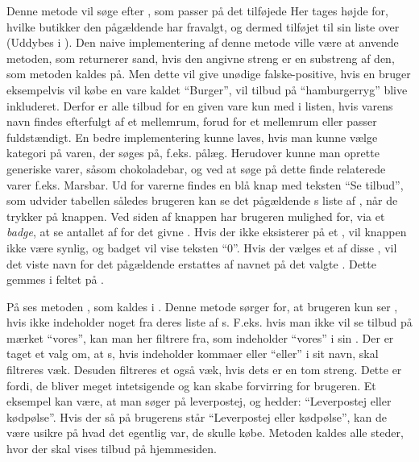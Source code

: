 Denne metode vil søge efter , som passer på det tilføjede 
Her tages højde for, hvilke butikker den pågældende  har fravalgt, og dermed tilføjet til sin liste over  (Uddybes i ).
Den naive implementering af denne metode ville være at anvende  metoden, som returnerer sand, hvis den angivne streng er en substreng af den, som metoden kaldes på. 
Men dette vil give unødige falske-positive, hvis en bruger eksempelvis vil købe en vare kaldet ``Burger'', vil tilbud på ``hamburgerryg'' blive inkluderet.
Derfor er alle tilbud for en given vare kun med i listen, hvis varens navn findes efterfulgt af et mellemrum, forud for et mellemrum eller passer fuldstændigt.
En bedre implementering kunne laves, hvis man kunne vælge kategori på varen, der søges på, f.eks. pålæg.
Herudover kunne man oprette generiske varer, såsom chokoladebar, og ved at søge på dette finde relaterede varer f.eks. Marsbar.
Ud for varerne findes en blå knap med teksten ``Se tilbud'', som udvider tabellen således brugeren kan se det pågældende s liste af , når de trykker på knappen.
Ved siden af knappen har brugeren mulighed for, via et \textit{badge}, at se antallet af  for det givne .
Hvis der ikke eksisterer  på et , vil knappen ikke være synlig, og badget vil vise teksten ``0''.
Hvis der vælges et af disse , vil det viste navn for det pågældende  erstattes af navnet på det valgte .
Dette gemmes i feltet  på .

På  ses metoden , som kaldes i . 
Denne metode sørger for, at brugeren kun ser , hvis  ikke indeholder noget fra deres liste af s.
F.eks. hvis man ikke vil se tilbud på mærket ``vores'', kan man her filtrere  fra, som indeholder ``vores'' i sin . 
Der er taget et valg om, at s, hvis  indeholder kommaer eller ``eller'' i sit navn, skal filtreres væk.
Desuden filtreres et  også væk, hvis dets  er en tom streng.
Dette er fordi, de bliver meget intetsigende og kan skabe forvirring for brugeren. 
Et eksempel kan være, at man søger på leverpostej, og  hedder: ``Leverpostej eller kødpølse''. 
Hvis der så på brugerens  står ``Leverpostej eller kødpølse'', kan de være usikre på hvad det egentlig var, de skulle købe. 
Metoden kaldes alle steder, hvor der skal vises tilbud på hjemmesiden.

